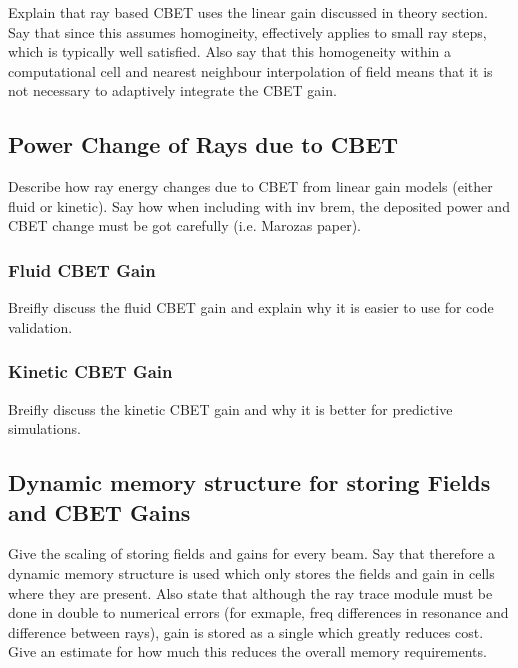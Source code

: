 Explain that ray based \ac{CBET} uses the linear gain discussed in theory section.
Say that since this assumes homogineity, effectively applies to small ray steps, which is typically well satisfied.
Also say that this homogeneity within a computational cell and nearest neighbour interpolation of field means that it is not necessary to adaptively integrate the CBET gain.

\subsection{Power Change of Rays due to CBET}

Describe how ray energy changes due to CBET from linear gain models (either fluid or kinetic).
Say how when including with inv brem, the deposited power and CBET change must be got carefully (i.e. Marozas paper).

\subsubsection{Fluid CBET Gain}

Breifly discuss the fluid CBET gain and explain why it is easier to use for code validation.

\subsubsection{Kinetic CBET Gain}

Breifly discuss the kinetic CBET gain and why it is better for predictive simulations.

\subsection{Dynamic memory structure for storing Fields and CBET Gains}

Give the scaling of storing fields and gains for every beam.
Say that therefore a dynamic memory structure is used which only stores the fields and gain in cells where they are present.
Also state that although the ray trace module must be done in double to numerical errors (for exmaple, freq differences in resonance and difference between rays), gain is stored as a single which greatly reduces cost.
Give an estimate for how much this reduces the overall memory requirements.

